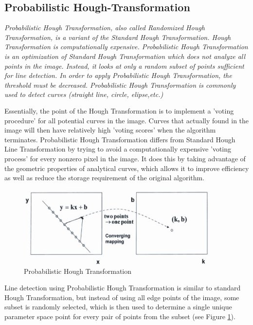%
\subsection{Probabilistic Hough-Transformation}\label{sec:Probabilistic Hough-Transformation}
%

\emph{\color{green}Probabilistic Hough Transformation, also called Randomized Hough Transformation, is a variant of the Standard Hough Transformation. Hough Transformation is computationally expensive. Probabilistic Hough Transformation is an optimization of Standard Hough Transformation which does not analyze all points in the image. Instead, it looks at only a random subset of points sufficient for line detection. In order to apply Probabilistic Hough Transformation, the threshold must be decreased. Probabilistic Hough Transformation is commonly used to detect curves (straight line, circle, elipse,etc.) }




Essentially, the point of the Hough Transformation is to implement a 'voting procedure' for all potential curves in the image. Curves that actually found in the image will then have relatively high 'voting scores' when the algorithm terminates. Probabilistic Hough Transformation differs from Standard Hough Line Transformation by trying to avoid a computationally expensive 'voting process' for every nonzero pixel in the image. It does this by taking advantage of the geometric properties of analytical curves, which allows it to improve efficiency as well as reduce the storage requirement of the original algorithm.


 \begin{figure}[H]
 \centering
  \includegraphics[width=0.9\textwidth]{./Bilder/Probabilistic_HT.png}
  \caption{Probabilistic Hough Transformation}
  \label{Probabilistic_HT_fig}
\end{figure}

Line detection using Probabilistic Hough Transformation is similar to standard Hough Transformation, but instead of using all edge points of the image, some subset is randomly selected, which is then used to determine a single unique parameter space point for every pair of points from the subset (see Figure \ref{Probabilistic_HT_fig}).


